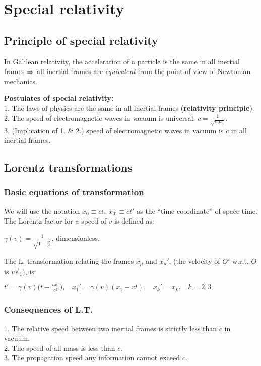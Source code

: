 \section{Special relativity}
\subsection{Principle of special relativity}
In Galilean relativity, the acceleration of a particle is the same in all inertial frames $\Rightarrow $ all inertial frames are \emph{equivalent} from the point of view of Newtonian mechanics.
\smallskip


\textbf{Postulates of special relativity:}\\
1. The laws of physics are the same in all inertial frames (\textbf{relativity principle}).\\
2. The speed of electromagnetic waves in vacuum is universal: $c=\frac{1}{\sqrt{\epsilon_{0}\mu_{0}}}$.\\
3. (Implication of 1. \& 2.) speed of electromagnetic waves in vacuum is $c$ in all inertial frames.



\subsection{Lorentz transformations}
\subsubsection*{Basic equations of transformation}
We will use the notation $x_{0}\equiv ct,\ x_{0'}\equiv c t'$ as the ``time coordinate'' of space-time. The Lorentz factor for a speed of $v$ is defined as:\\
\centerline{$\gamma(v)=\frac{1}{\sqrt{1-\frac{v^{2}}{c^{2}}}}$, dimensionless.}
The L. transformation relating the frames $x_{\mu}$ and $x_{\mu}'$, (the velocity of $O'$ w.r.t. $O$ is $v\vec{e}_{1}$), is:\\
\centerline{$t'=\gamma(v)\Big(t-\frac{vx_{1}}{c^{2}}\Big),\ \ \ \ x_{1}'=\gamma(v)(x_{1}-vt),\ \ \ \ x_{k}'=x_{k},\ \ \ \ k=2,3$}
\subsubsection*{Consequences of L.T.}
1. The relative speed between two inertial frames is strictly less than $c$ in vacuum.\\
2. The speed of all mass is less than $c$.\\
3. The propagation speed any information cannot exceed $c$.




